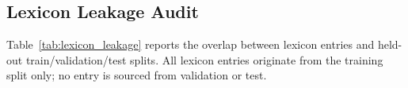 \documentclass[runningheads]{llncs}
\begin{document}
\subsection{Lexicon Leakage Audit}\label{subsec:lexicon_leakage}
Table~\ref{tab:lexicon_leakage} reports the overlap between lexicon entries and held-out train/validation/test splits. All lexicon entries originate from the training split only; no entry is sourced from validation or test.

\begin{table}[H]
\centering
\caption{Lexicon leakage audit across train/validation/test splits.}\label{tab:lexicon_leakage}
\scriptsize
\setlength{\tabcolsep}{2pt}

\end{table}
\end{document}
